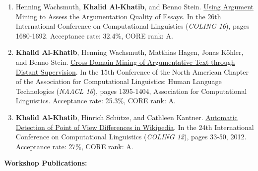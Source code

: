 \begin{enumerate}
{Acceptance rate: 32.4\%, CORE rank: A. 
}
\item {Henning Wachsmuth, \textbf{Khalid Al-Khatib}, and Benno Stein. \href{https://aclanthology.org/C16-1158/}{Using Argument Mining to Assess the Argumentation Quality of Essays}. In the 26th International Conference on Computational Linguistics (\textit{COLING 16}), pages 1680-1692. 
Acceptance rate: 32.4\%, CORE rank: A.
}
\item {\textbf{Khalid Al-Khatib}, Henning Wachsmuth, Matthias Hagen, Jonas Köhler, and Benno Stein. \href{https://aclanthology.org/N16-1165/}{Cross-Domain Mining of Argumentative Text through Distant Supervision}. In the 15th Conference of the North American Chapter of the Association for Computational Linguistics: Human Language Technologies (\textit{NAACL 16}), pages 1395-1404, Association for Computational Linguistics.
Acceptance rate: 25.3\%, CORE rank: A.
}
\item {\textbf{Khalid Al-Khatib}, Hinrich Schütze, and Cathleen Kantner. \href{https://aclanthology.org/C12-1003/}{Automatic Detection of Point of View Differences in Wikipedia}. In the 24th International Conference on Computational Linguistics (\textit{COLING 12}), pages 33-50, 2012.
Acceptance rate: 27\%, CORE rank: A.
}

\end{enumerate}

\textbf{Workshop Publications:}

